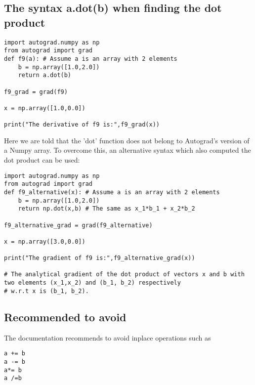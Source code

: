 \documentclass[%
oneside,                 %
final,                   %
10pt]{article}
\begin{document}
\subsection*{The syntax a.dot(b) when finding the dot product}
\begin{verbatim}
import autograd.numpy as np
from autograd import grad
def f9(a): # Assume a is an array with 2 elements
    b = np.array([1.0,2.0])
    return a.dot(b)

f9_grad = grad(f9)

x = np.array([1.0,0.0])

print("The derivative of f9 is:",f9_grad(x))
\end{verbatim}

Here we are told that the 'dot' function does not belong to Autograd's
version of a Numpy array.  To overcome this, an alternative syntax
which also computed the dot product can be used:

\begin{verbatim}
import autograd.numpy as np
from autograd import grad
def f9_alternative(x): # Assume a is an array with 2 elements
    b = np.array([1.0,2.0])
    return np.dot(x,b) # The same as x_1*b_1 + x_2*b_2

f9_alternative_grad = grad(f9_alternative)

x = np.array([3.0,0.0])

print("The gradient of f9 is:",f9_alternative_grad(x))

# The analytical gradient of the dot product of vectors x and b with two elements (x_1,x_2) and (b_1, b_2) respectively
# w.r.t x is (b_1, b_2).
\end{verbatim}

\subsection*{Recommended to avoid}
The documentation recommends to avoid inplace operations such as
\begin{verbatim}
a += b
a -= b
a*= b
a /=b
\end{verbatim}




\end{document}

